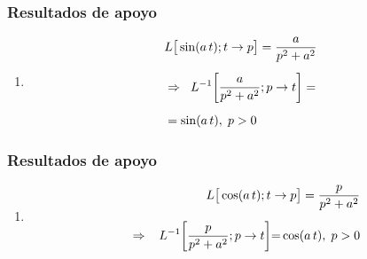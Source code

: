 \begin{frame}
\frametitle{Resultados de apoyo}
\begin{enumerate}[<+->]
\conti
\item
\begin{align*}
&L \big[ \sin (a \, t); t \to p \big] = \dfrac{a}{p^{2} + a^{2}} \\[0.5em] 
&\Rightarrow \hspace{0.2cm} L^{-1} \bigg[ \dfrac{a}{p^{2} + a^{2}}; p \to t \bigg] = \\[0.5em]
&= \sin (a \, t), \hspace{0.1cm} p > 0
\end{align*}
\seti
\end{enumerate}
\end{frame}
\begin{frame}
\frametitle{Resultados de apoyo}
\begin{enumerate}[<+->]
\conti
\item 
\begin{align*}
L \big[ \cos (a \, t); t \to p \big] = \dfrac{p}{p^{2} + a^{2}} \\[0.5em] 
\hspace{0.3cm} \Rightarrow \hspace{0.3cm} L^{-1} \bigg[ \dfrac{p}{p^{2} + a^{2}}; p \to t \bigg] {=} \cos (a \, t), \hspace{0.1cm} p > 0
\end{align*}
\end{enumerate}
\end{frame}



